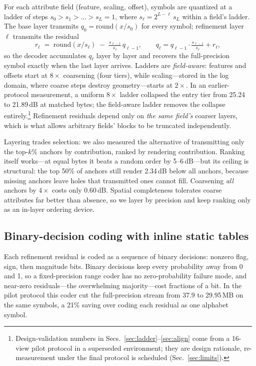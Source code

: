 For each attribute field (feature, scaling, offset), symbols are quantized at a ladder of steps $s_0 > s_1 > \dots > s_L = 1$, where $s_\ell = 2^{L-\ell}\,s_L$ within a field's ladder.
The base layer transmits $q_0 = \mathrm{round}(x / s_0)$ for every symbol; refinement layer $\ell$ transmits the residual
\begin{equation}
r_\ell \;=\; \mathrm{round}(x / s_\ell) \;-\; \tfrac{s_{\ell-1}}{s_\ell}\, q_{\ell-1},
\qquad q_\ell = q_{\ell-1}\cdot\tfrac{s_{\ell-1}}{s_\ell} + r_\ell ,
\label{eq:residual}
\end{equation}
so the decoder accumulates $q_\ell$ layer by layer and recovers the full-precision symbol exactly when the last layer arrives.
Ladders are \emph{field-aware}: features and offsets start at $8\times$ coarsening (four tiers), while scaling---stored in the log domain, where coarse steps destroy geometry---starts at $2\times$.
In an earlier-protocol measurement, a uniform $8\times$ ladder collapsed the entry tier from 25.24 to 21.89\,dB at matched bytes; the field-aware ladder removes the collapse entirely.\footnote{Design-validation numbers in Secs.~\ref{sec:ladder}--\ref{sec:align} come from a 16-view pilot protocol in a superseded environment; they are design rationale, re-measurement under the final protocol is scheduled (Sec.~\ref{sec:limits}).}
Refinement residuals depend only on \emph{the same field's} coarser layers, which is what allows arbitrary fields' blocks to be truncated independently.

Layering trades selection: we also measured the alternative of transmitting only the top-$k\%$ anchors by contribution, ranked by rendering contribution.
Ranking itself works---at equal bytes it beats a random order by 5--6\,dB---but its ceiling is structural: the top 50\% of anchors still render 2.34\,dB below all anchors, because missing anchors leave holes that transmitted ones cannot fill.
Coarsening \emph{all} anchors by $4\times$ costs only 0.60\,dB.
Spatial completeness tolerates coarse attributes far better than absence, so we layer by precision and keep ranking only as an in-layer ordering device.

\subsection{Binary-decision coding with inline static tables}
\label{sec:coding}

Each refinement residual is coded as a sequence of binary decisions: nonzero flag, sign, then magnitude bits.
Binary decisions keep every probability away from 0 and 1, so a fixed-precision range coder has no zero-probability failure mode, and near-zero residuals---the overwhelming majority---cost fractions of a bit.
In the pilot protocol this coder cut the full-precision stream from 37.9 to 29.95\,MB on the same symbols, a 21\% saving over coding each residual as one alphabet symbol.

